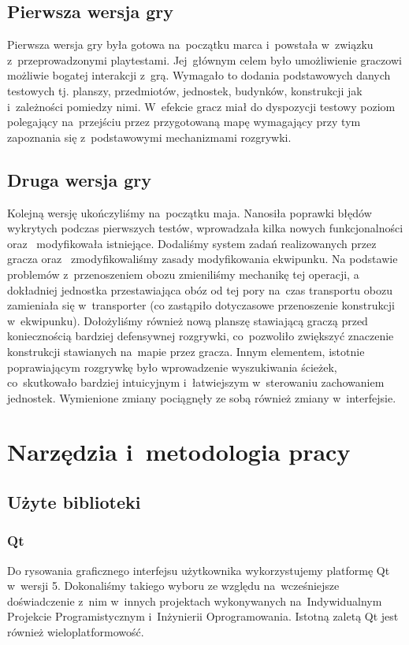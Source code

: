 \documentclass[licencjacka]{pracamgr}
\begin{document}
    \section{Pierwsza wersja gry}
    Pierwsza wersja gry była gotowa na~początku marca i~powstała w~związku z~przeprowadzonymi playtestami. Jej~głównym
    celem było umożliwienie graczowi możliwie bogatej interakcji z~grą. Wymagało to dodania podstawowych
    danych testowych tj. planszy, przedmiotów, jednostek, budynków, konstrukcji jak i~zależności pomiedzy nimi.
    W~efekcie gracz miał do dyspozycji testowy poziom polegający na~przejściu przez przygotowaną mapę wymagający
    przy tym zapoznania się z~podstawowymi mechanizmami rozgrywki.

    \section{Druga wersja gry}
    Kolejną wersję ukończyliśmy na~początku maja. Nanosiła poprawki błędów wykrytych podczas pierwszych testów, wprowadzała kilka nowych
    funkcjonalności oraz~ modyfikowała istniejące. Dodaliśmy system zadań realizowanych przez gracza oraz~ zmodyfikowaliśmy zasady modyfikowania
    ekwipunku. Na podstawie problemów z~przenoszeniem obozu zmieniliśmy mechanikę tej operacji, a dokładniej jednostka przestawiająca
    obóz od tej pory na~czas transportu obozu zamieniała się w~transporter (co zastąpiło dotyczasowe przenoszenie konstrukcji w~ekwipunku).
    Dołożyliśmy również nową planszę stawiającą graczą przed koniecznością bardziej defensywnej rozgrywki,
    co~pozwoliło zwiększyć znaczenie konstrukcji stawianych na~mapie przez gracza. Innym elementem, istotnie poprawiającym
    rozgrywkę było wprowadzenie wyszukiwania ścieżek, co~skutkowało bardziej intuicyjnym i~łatwiejszym w~sterowaniu
    zachowaniem jednostek. Wymienione zmiany pociągnęły ze sobą również zmiany w~interfejsie.

\chapter{Narzędzia i~metodologia pracy}
  \section{Użyte biblioteki}
    \subsection{Qt}
      Do rysowania graficznego interfejsu użytkownika wykorzystujemy platformę Qt\cite{QT} w~wersji 5. Dokonaliśmy takiego wyboru
      ze względu na~wcześniejsze doświadczenie z~nim w~innych projektach wykonywanych na~Indywidualnym Projekcie Programistycznym
      i~Inżynierii Oprogramowania. Istotną zaletą Qt jest również wieloplatformowość.
\end{document}
